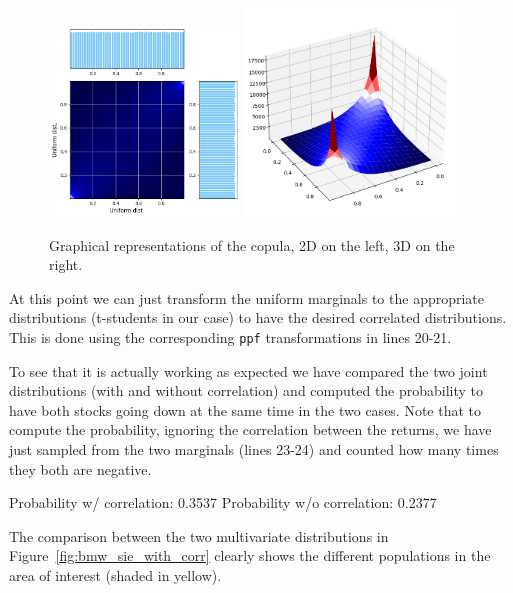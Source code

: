 \begin{figure}[htbp]
	\centering
	\includegraphics[width=0.45\textwidth]{figures/copula_2d}
	\quad
	\includegraphics[width=0.5\textwidth]{figures/copula_3d}
	\caption{Graphical representations of the copula, 2D on the left, 3D on the right.}
	\label{fig:copula}
\end{figure}

At this point we can just transform the uniform marginals to the appropriate distributions (t-students in our case) to have the desired correlated distributions. This is done using the corresponding \texttt{ppf} transformations in lines 20-21.

To see that it is actually working as expected we have compared the two joint distributions (with and without correlation) and computed the probability to have both stocks going down at the same time in the two cases.
Note that to compute the probability, ignoring the correlation between the returns, we have just sampled from the two marginals (lines 23-24) and counted how many times they both are negative.

\begin{ioutput}
Probability w/ correlation: 0.3537
Probability w/o correlation: 0.2377
\end{ioutput}

The comparison between the two multivariate distributions in Figure~\ref{fig:bmw_sie_with_corr} clearly shows the different populations in the area of interest (shaded in yellow).

